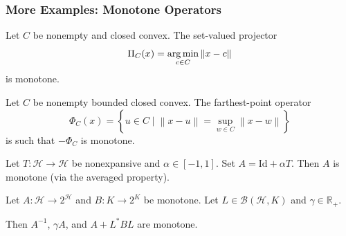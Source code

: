 \documentclass[aspectratio=169,10pt]{beamer}
\newcommand{\Id}{\mathrm{Id}}
\newcommand{\norm}[1]{\left\|#1\right\|}
\newcommand{\set}[1]{\left\{#1\right\}}
\newcommand{\Hilbert}{\mathcal{H}}
\newcommand{\Reals}{\mathbb{R}}
\newcommand{\argmin}{\operatornamewithlimits{arg\,min}}
\begin{document}
\begin{frame}
    \frametitle{More Examples: Monotone Operators}

    \begin{example}
        Let $C$ be nonempty and closed convex. The set-valued projector
        \[
            \Pi_C(x) = \argmin_{c \in C} \norm{x - c}
        \]
        is monotone.
    \end{example}

    \vspace{0.8em}

    \begin{example}
        Let $C$ be nonempty bounded closed convex. The farthest-point operator
        \[
            \Phi_C(x) = \set{u \in C \mid \norm{x - u} = \sup_{w \in C} \norm{x - w}}
        \]
        is such that $-\Phi_C$ is monotone.
    \end{example}

    \vspace{0.8em}

    \begin{example}
        Let $T : \Hilbert \to \Hilbert$ be nonexpansive and $\alpha \in [-1, 1]$. Set $A = \Id + \alpha T$.
        Then $A$ is monotone (via the averaged property).
    \end{example}

    \vspace{0.8em}

    \begin{theorem}
        Let $A : \Hilbert \to 2^{\Hilbert}$ and $B : K \to 2^K$ be monotone.
        Let $L \in \mathcal{B}(\Hilbert, K)$ and $\gamma \in \Reals_+$.

        Then $A^{-1}$, $\gamma A$, and $A + L^* B L$ are monotone.
    \end{theorem}
\end{frame}
\end{document}
